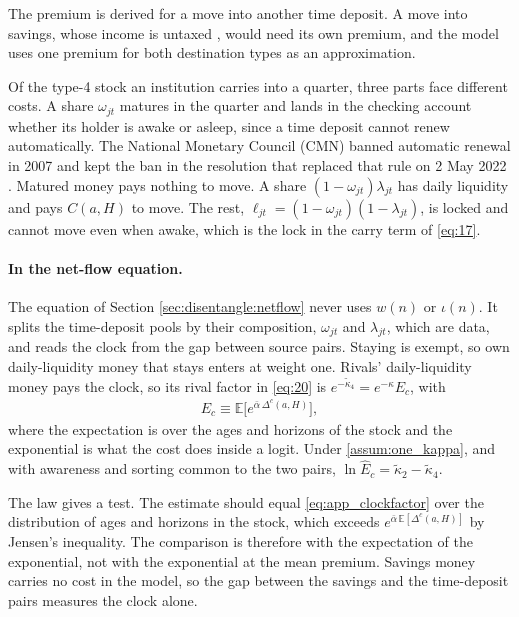 The premium is derived for a move into another time deposit. A move into savings, whose income is untaxed \parencite{brasil_lei8981_1995}, would need its own premium, and the model uses one premium for both destination types as an approximation.

Of the type-4 stock an institution carries into a quarter, three parts face different costs. A share $\omega_{jt}$ matures in the quarter and lands in the checking account whether its holder is awake or asleep, since a time deposit cannot renew automatically. The National Monetary Council (CMN) banned automatic renewal in 2007 \parencite{cmn_resolucao_3454_2007} and kept the ban in the resolution that replaced that rule on 2 May 2022 \parencite{cmn_resolucao_5005_2022}. Matured money pays nothing to move. A share $(1-\omega_{jt})\lambda_{jt}$ has daily liquidity and pays $C(a,H)$ to move. The rest, $\ell_{jt}=(1-\omega_{jt})(1-\lambda_{jt})$, is locked and cannot move even when awake, which is the lock in the carry term of \eqref{eq:17}.

\paragraph{In the net-flow equation.} The equation of Section \ref{sec:disentangle:netflow} never uses $w(n)$ or $\iota(n)$. It splits the time-deposit pools by their composition, $\omega_{jt}$ and $\lambda_{jt}$, which are data, and reads the clock from the gap between source pairs. Staying is exempt, so own daily-liquidity money that stays enters at weight one. Rivals' daily-liquidity money pays the clock, so its rival factor in \eqref{eq:20} is $e^{-\tilde{\kappa}_4}=e^{-\kappa}E_c$, with
\begin{gather}
	E_c\equiv\mathbb{E}\bigl[e^{\bar{\alpha}\,\Delta^{c}(a,H)}\bigr], \label{eq:app_clockfactor}
\end{gather}
where the expectation is over the ages and horizons of the stock and the exponential is what the cost does inside a logit. Under \ref{assum:one_kappa}, and with awareness and sorting common to the two pairs, $\ln\hat{E}_c=\tilde{\kappa}_2-\tilde{\kappa}_4$.

The law gives a test. The estimate should equal \eqref{eq:app_clockfactor} over the distribution of ages and horizons in the stock, which exceeds $e^{\bar{\alpha}\,\mathbb{E}[\Delta^{c}(a,H)]}$ by Jensen's inequality. The comparison is therefore with the expectation of the exponential, not with the exponential at the mean premium. Savings money carries no cost in the model, so the gap between the savings and the time-deposit pairs measures the clock alone.

